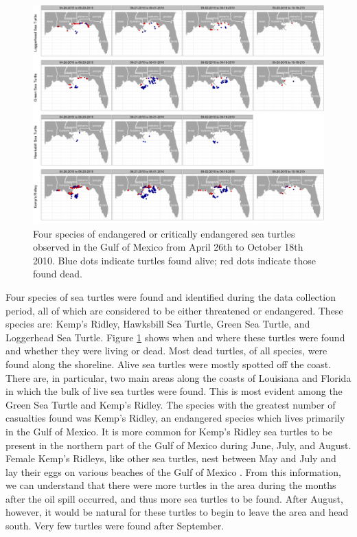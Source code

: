 \documentclass[authoryear,12pt]{elsarticle}
\begin{document}
\begin{figure}[htbp] %
   \centering
   \includegraphics[width=6in]{turtles.png} 
   \caption{Four species of endangered or critically endangered sea turtles observed in the Gulf of Mexico from April 26th to October 18th 2010.  Blue dots indicate turtles found alive; red dots indicate those found dead.}
   \label{turtles}
\end{figure}

Four species of sea turtles were found and identified during the data collection period, all of which are considered to be either threatened or endangered. These species are: Kemp's Ridley, Hawksbill Sea Turtle, Green Sea Turtle, and Loggerhead Sea Turtle. Figure \ref{turtles} shows when and where these turtles were found and whether they were living or dead. Most dead turtles, of all species, were found along the shoreline. Alive sea turtles were mostly spotted off the coast. There are, in particular, two main areas along the coasts of Louisiana and Florida in which the bulk of live sea turtles were found.  This is most evident among the Green Sea Turtle and Kemp's Ridley. The species with the greatest number of casualties found was Kemp's Ridley, an endangered species which lives primarily in the Gulf of Mexico.  It is more common for Kemp's Ridley sea turtles to be present in the northern part of the Gulf of Mexico during June, July, and August. Female Kemp's Ridleys, like other sea turtles, nest between May and July and lay their eggs on various beaches of the Gulf of Mexico  \citet{turtles}. From this information, we can understand that there were more turtles in the area during the months after the oil spill occurred, and thus more sea turtles to be found.  After August, however, it would be natural for these turtles to begin to leave the area and head south. Very few turtles were found after September.
\end{document}
